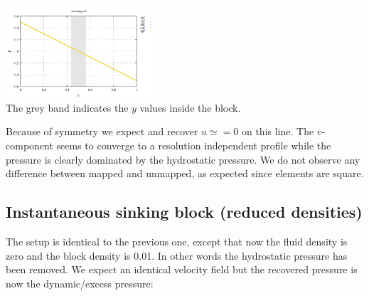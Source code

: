 \begin{center}
\includegraphics[width=5.7cm]{python_codes/fieldstone_76/results/block/profile_m2_p.pdf}\\
{\captionfont The grey band indicates the $y$ values inside the block.}
\end{center}

Because of symmetry we expect and recover $u\simeq =0$ on this line.
The $v$-component seems to converge to a resolution independent profile
while the pressure is clearly dominated by the hydrostatic pressure.
We do not observe any difference between mapped and unmapped, as expected
since elements are square.

\newpage
\subsection*{Instantaneous sinking block (reduced densities)}

The setup is identical to the previous one, except that now the fluid density is zero and 
the block density is 0.01. In other words the hydrostatic pressure has been removed.
We expect an identical velocity field but the recovered pressure is now the 
dynamic/excess pressure:


